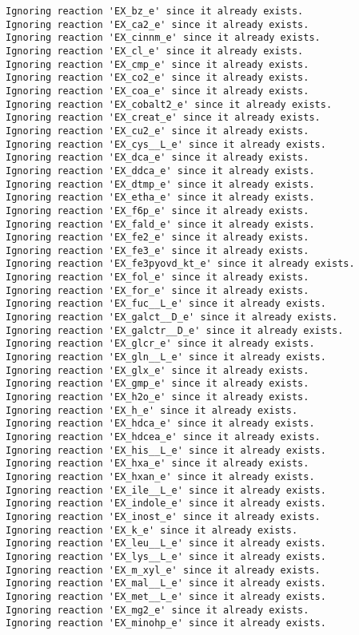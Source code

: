 \documentclass[
  letterpaper,
  DIV=11,
  numbers=noendperiod]{scrartcl}
\begin{document}
\begin{verbatim}
Ignoring reaction 'EX_bz_e' since it already exists.
Ignoring reaction 'EX_ca2_e' since it already exists.
Ignoring reaction 'EX_cinnm_e' since it already exists.
Ignoring reaction 'EX_cl_e' since it already exists.
Ignoring reaction 'EX_cmp_e' since it already exists.
Ignoring reaction 'EX_co2_e' since it already exists.
Ignoring reaction 'EX_coa_e' since it already exists.
Ignoring reaction 'EX_cobalt2_e' since it already exists.
Ignoring reaction 'EX_creat_e' since it already exists.
Ignoring reaction 'EX_cu2_e' since it already exists.
Ignoring reaction 'EX_cys__L_e' since it already exists.
Ignoring reaction 'EX_dca_e' since it already exists.
Ignoring reaction 'EX_ddca_e' since it already exists.
Ignoring reaction 'EX_dtmp_e' since it already exists.
Ignoring reaction 'EX_etha_e' since it already exists.
Ignoring reaction 'EX_f6p_e' since it already exists.
Ignoring reaction 'EX_fald_e' since it already exists.
Ignoring reaction 'EX_fe2_e' since it already exists.
Ignoring reaction 'EX_fe3_e' since it already exists.
Ignoring reaction 'EX_fe3pyovd_kt_e' since it already exists.
Ignoring reaction 'EX_fol_e' since it already exists.
Ignoring reaction 'EX_for_e' since it already exists.
Ignoring reaction 'EX_fuc__L_e' since it already exists.
Ignoring reaction 'EX_galct__D_e' since it already exists.
Ignoring reaction 'EX_galctr__D_e' since it already exists.
Ignoring reaction 'EX_glcr_e' since it already exists.
Ignoring reaction 'EX_gln__L_e' since it already exists.
Ignoring reaction 'EX_glx_e' since it already exists.
Ignoring reaction 'EX_gmp_e' since it already exists.
Ignoring reaction 'EX_h2o_e' since it already exists.
Ignoring reaction 'EX_h_e' since it already exists.
Ignoring reaction 'EX_hdca_e' since it already exists.
Ignoring reaction 'EX_hdcea_e' since it already exists.
Ignoring reaction 'EX_his__L_e' since it already exists.
Ignoring reaction 'EX_hxa_e' since it already exists.
Ignoring reaction 'EX_hxan_e' since it already exists.
Ignoring reaction 'EX_ile__L_e' since it already exists.
Ignoring reaction 'EX_indole_e' since it already exists.
Ignoring reaction 'EX_inost_e' since it already exists.
Ignoring reaction 'EX_k_e' since it already exists.
Ignoring reaction 'EX_leu__L_e' since it already exists.
Ignoring reaction 'EX_lys__L_e' since it already exists.
Ignoring reaction 'EX_m_xyl_e' since it already exists.
Ignoring reaction 'EX_mal__L_e' since it already exists.
Ignoring reaction 'EX_met__L_e' since it already exists.
Ignoring reaction 'EX_mg2_e' since it already exists.
Ignoring reaction 'EX_minohp_e' since it already exists.

\end{verbatim}
\end{document}
